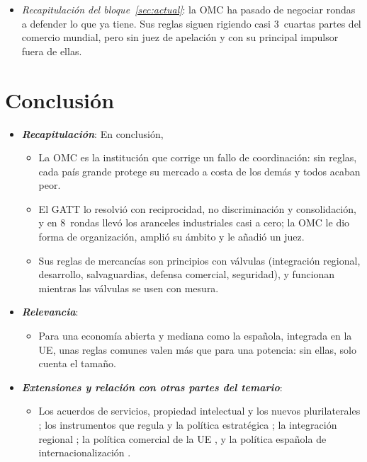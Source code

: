 \documentclass[11pt]{article}
\begin{document}
\begin{itemize}
\item \emph{Recapitulación del bloque~\ref{sec:actual}}: la OMC ha pasado de negociar rondas a defender lo que ya tiene. Sus reglas siguen rigiendo casi 3~cuartas partes del comercio mundial, pero sin juez de apelación y con su principal impulsor fuera de ellas.
\end{itemize}

\section*{Conclusión}

\begin{itemize}
\item \textbf{\emph{Recapitulación}}: En conclusión,
  \begin{itemize}
  \item La OMC es la institución que corrige un fallo de coordinación: sin reglas, cada país grande protege su mercado a costa de los demás y todos acaban peor.
  \item El GATT lo resolvió con reciprocidad, no discriminación y consolidación, y en 8~rondas llevó los aranceles industriales casi a cero; la OMC le dio forma de organización, amplió su ámbito y le añadió un juez.
  \item Sus reglas de mercancías son principios con válvulas (integración regional, desarrollo, salvaguardias, defensa comercial, seguridad), y funcionan mientras las válvulas se usen con mesura.
  \end{itemize}
\item \textbf{\emph{Relevancia}}:
  \begin{itemize}
  \item Para una economía abierta y mediana como la española, integrada en la UE, unas reglas comunes valen más que para una potencia: sin ellas, solo cuenta el tamaño.
  \end{itemize}
\item \textbf{\emph{Extensiones y relación con otras partes del temario}}:
  \begin{itemize}
  \item Los acuerdos de servicios, propiedad intelectual y los nuevos plurilaterales ; los instrumentos que regula  y la política estratégica ; la integración regional  ; la política comercial de la UE , y la política española de internacionalización .

\end{itemize}
\end{itemize}
\end{document}

